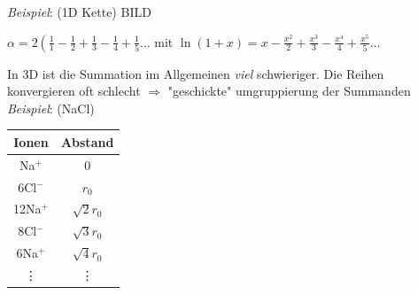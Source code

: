 \documentclass[paper=A4,12pt,pagesize,twoside,BCOR=8mm,ngerman]{scrartcl}
\begin{document}
				
				\emph{Beispiel}: (1D Kette)
				BILD
				
				$\alpha = 2\left( \frac{1}{1} - \frac{1}{2} + \frac{1}{3} - \frac{1}{4} + \frac{1}{5} \ldots${}
				mit $\ln (1+x) =x - \frac{x^{2}}{2} + \frac{x^{3}}{3} - \frac{x^{4}}{4} + \frac{x^{5}}{5} \ldots $
				
				
				In 3D ist die Summation im Allgemeinen \emph{viel} schwieriger. Die Reihen konvergieren oft schlecht $\Rightarrow${}
				"geschickte" umgruppierung der Summanden\\
				
				\emph{Beispiel}: (NaCl)
				\begin{tabular}{cc}
					\toprule{}
					Ionen		&	Abstand		\\
					\midrule{}
					Na$^{+}$	&	0			\\
					6Cl$^{-}$	&	$r_{0}$		\\
					12Na$^{+}$	&	$\sqrt{2}r_{0}$\\
					8Cl$^{-}$	&	$\sqrt{3}r_{0}$\\
					6Na$^{+}$	&	$\sqrt{4}r_{0}$\\
					\vdots		&	\vdots{}
					\bottomrule
				\end{tabular}
\end{document}
